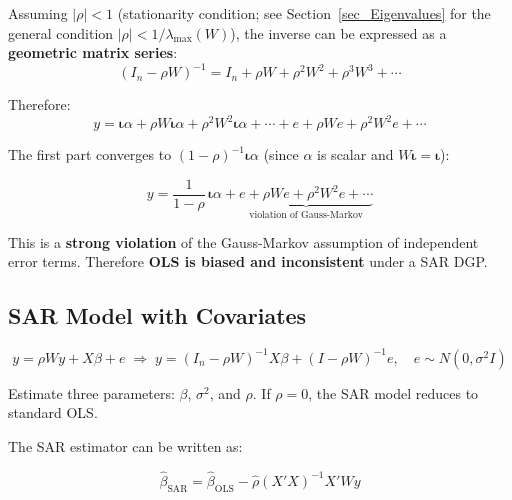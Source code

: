 Assuming $|\rho| < 1$ (stationarity condition; see Section~\ref{sec_Eigenvalues}
for the general condition $|\rho| < 1/\lambda_{\max}(W)$), the inverse can be
expressed as a \textbf{geometric matrix series}:
\begin{equation}
  (I_n - \rho W)^{-1} = I_n + \rho W + \rho^2 W^2 + \rho^3 W^3 + \cdots
\end{equation}

Therefore:
\begin{equation}
  y = \boldsymbol{\iota}\alpha + \rho W\boldsymbol{\iota}\alpha
      + \rho^2 W^2\boldsymbol{\iota}\alpha + \cdots
      + e + \rho We + \rho^2 W^2 e + \cdots
\end{equation}

The first part converges to $(1-\rho)^{-1}\boldsymbol{\iota}\alpha$ (since
$\alpha$ is scalar and $W\boldsymbol{\iota} = \boldsymbol{\iota}$):

\begin{tcolorbox}[keyresult]
\begin{equation}
  y = \frac{1}{1-\rho}\,\boldsymbol{\iota}\alpha
      + \underbrace{e + \rho We + \rho^2 W^2 e + \cdots}_{\text{violation of Gauss-Markov}}
\end{equation}
\end{tcolorbox}

This is a \textbf{strong violation} of the Gauss-Markov assumption of
independent error terms. Therefore \textbf{OLS is biased and inconsistent}
under a SAR DGP.

\subsection{SAR Model with Covariates}

\begin{equation}
  y = \rho Wy + X\beta + e
  \;\Longrightarrow\;
  y = (I_n-\rho W)^{-1}X\beta + (I-\rho W)^{-1}e, \quad e\sim N(0,\sigma^2I)
\end{equation}

Estimate three parameters: $\beta$, $\sigma^2$, and $\rho$.
If $\rho=0$, the SAR model reduces to standard OLS.

The SAR estimator can be written as:

\begin{tcolorbox}[keyresult]
\begin{equation}
  \hat\beta_\text{SAR} = \hat\beta_\text{OLS} - \hat\rho(X'X)^{-1}X'Wy
  \label{eq_SARbeta}
\end{equation}
\end{tcolorbox}



